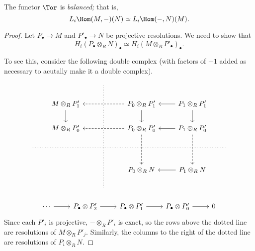 \documentclass[main.tex]{subfiles}
\begin{document}
\begin{proposition}
  \label{prop:tor_balanced}
  The functor $\Tor$ is \emph{balanced;} that is,
  \begin{equation*}
    L_{i} \Hom(M, -)(N) \simeq L_{i} \Hom(-, N)(M).
  \end{equation*}
\end{proposition}
\begin{proof}
  Let $P_{\bullet} \to M$ and $P'_{\bullet} \to N$ be projective resolutions. We need to show that
  \begin{equation*}
    H_{i}(P_{\bullet} \otimes_{R} N)_{\bullet} \simeq H_{i}(M \otimes_{R} P'_{\bullet})_{\bullet}.
  \end{equation*}

  To see this, consider the following double complex (with factors of $-1$ added as necessary to acutally make it a double complex).
  \begin{equation*}
    \begin{tikzcd}
      && \
      \arrow[ddddd, no head, dotted]
      \\
      & M \otimes_{R} P'_{1}
      \arrow[d]
      && P_{0} \otimes_{R} P'_{1}
      \arrow[ll, dashed]
      \arrow[d]
      & P_{1} \otimes_{R} P'_{1}
      \arrow[l]
      \arrow[d]
      \\
      & M \otimes_{R} P'_{0}
      && P_{0} \otimes_{R} P'_{0}
      \arrow[ll, dashed]
      \arrow[dd, dashed]
      & P_{1} \otimes_{R} P'_{0}
      \arrow[l]
      \arrow[dd, dashed]
      \\
      \
      \arrow[rrrrr, dotted, no head]
      &&&&& \
      \\
      &&& P_{0} \otimes_{R} N
      & P_{1} \otimes_{R} N
      \arrow[l]
      \\
      && \
    \end{tikzcd}
  \end{equation*}

  \begin{equation*}
    \begin{tikzcd}
      \cdots
      \arrow[r]
      & P_{\bullet} \otimes P'_{2}
      \arrow[r]
      & P_{\bullet} \otimes P'_{1}
      \arrow[r]
      & P_{\bullet} \otimes P'_{0}
      \arrow[r]
      & 0
    \end{tikzcd}
  \end{equation*}
  Since each $P'_{i}$ is projective, $- \otimes_{R} P'_{i}$ is exact, so the rows above the dotted line are resolutions of $M \otimes_{R} P'_{j}$. Similarly, the columns to the right of the dotted line are resolutions of $P_{i} \otimes_{R} N$.


\end{proof}
\end{document}
